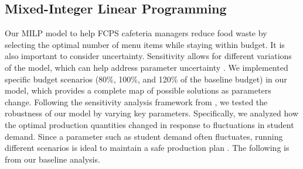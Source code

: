 \documentclass{scrartcl}
\begin{document}
\subsection{Mixed-Integer Linear Programming}

Our MILP model to help FCPS cafeteria managers reduce food waste by selecting the optimal number of menu items while staying within budget. It is also important to consider uncertainty. Sensitivity allows for different variations of the model, which can help address parameter uncertainty \cite{algo_milp}. We implemented specific budget scenarios (80\%, 100\%, and 120\% of the baseline budget) in our model, which provides a complete map of possible solutions as parameters change. Following the sensitivity analysis framework from \cite{ren}, we tested the robustness of our model by varying key parameters. Specifically, we analyzed how the optimal production quantities changed in response to fluctuations in student demand. Since a parameter such as student demand often fluctuates, running different scenarios is ideal to maintain a safe production plan \cite{mathmodel}. The following is from our baseline analysis.
\end{document}

